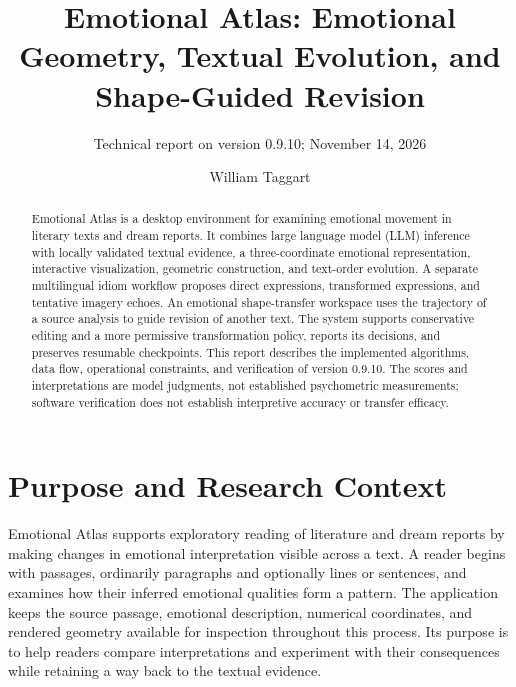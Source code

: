 \documentclass[manuscript,screen,nonacm]{acmart}
\begin{document}
\title{Emotional Atlas: Emotional Geometry, Textual Evolution, and Shape-Guided Revision}
\author{William Taggart}
\subtitle{Technical report on version 0.9.10; November 14, 2026}
\begin{abstract}
Emotional Atlas is a desktop environment for examining emotional
movement in literary texts and dream reports. It combines large language
model (LLM) inference with locally validated textual evidence, a
three-coordinate emotional representation, interactive visualization,
geometric construction, and text-order evolution. A separate
multilingual idiom workflow proposes direct expressions, transformed
expressions, and tentative imagery echoes. An emotional shape-transfer
workspace uses the trajectory of a source analysis to guide revision of
another text. The system supports conservative editing and a more
permissive transformation policy, reports its decisions, and preserves
resumable checkpoints. This report describes the implemented algorithms,
data flow, operational constraints, and verification of version 0.9.10.
The scores and interpretations are model judgments, not established
psychometric measurements; software verification does not establish
interpretive accuracy or transfer efficacy.
\end{abstract}
\maketitle
\section{Purpose and Research Context}\label{scope-and-design}

Emotional Atlas supports exploratory reading of literature and dream reports by making changes in emotional interpretation visible across a text. A reader begins with passages, ordinarily paragraphs and optionally lines or sentences, and examines how their inferred emotional qualities form a pattern. The application keeps the source passage, emotional description, numerical coordinates, and rendered geometry available for inspection throughout this process. Its purpose is to help readers compare interpretations and experiment with their consequences while retaining a way back to the textual evidence.
\end{document}
